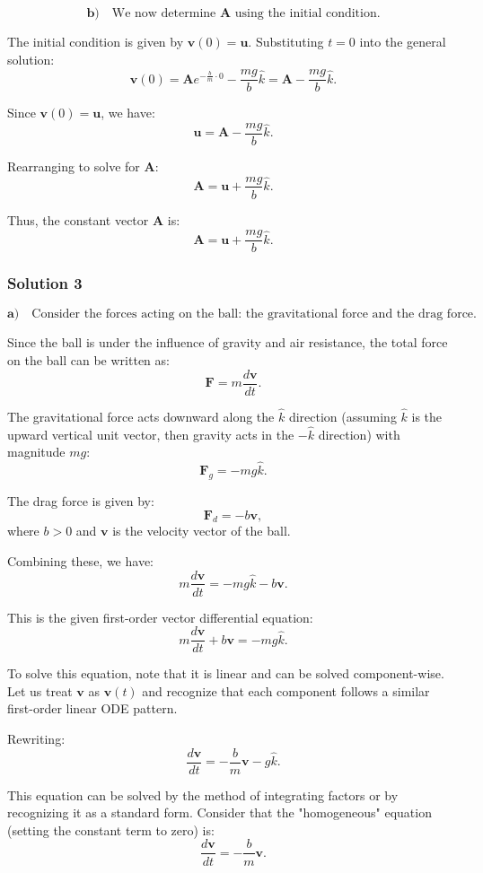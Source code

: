 \documentclass{article}
\begin{document}
\[
\textbf{b)}\quad \text{We now determine } \mathbf{A} \text{ using the initial condition.}
\]

The initial condition is given by \(\mathbf{v}(0) = \mathbf{u}\). Substituting \(t = 0\) into the general solution:
\[
\mathbf{v}(0) = \mathbf{A}e^{-\frac{b}{m}\cdot 0} - \frac{mg}{b}\hat{k} = \mathbf{A} - \frac{mg}{b}\hat{k}.
\]

Since \(\mathbf{v}(0) = \mathbf{u}\), we have:
\[
\mathbf{u} = \mathbf{A} - \frac{mg}{b}\hat{k}.
\]

Rearranging to solve for \(\mathbf{A}\):
\[
\mathbf{A} = \mathbf{u} + \frac{mg}{b}\hat{k}.
\]

Thus, the constant vector \(\mathbf{A}\) is:
\[
\boxed{\mathbf{A} = \mathbf{u} + \frac{mg}{b}\hat{k}.}
\]

\subsubsection{Solution 3}
\[
\textbf{a)} \quad \text{Consider the forces acting on the ball: the gravitational force and the drag force.}
\]

Since the ball is under the influence of gravity and air resistance, the total force on the ball can be written as:
\[
\mathbf{F} = m\frac{d\mathbf{v}}{dt}.
\]

The gravitational force acts downward along the \(\hat{k}\) direction (assuming \(\hat{k}\) is the upward vertical unit vector, then gravity acts in the \(-\hat{k}\) direction) with magnitude \(mg\):
\[
\mathbf{F}_g = - mg \hat{k}.
\]

The drag force is given by:
\[
\mathbf{F}_d = -b \mathbf{v},
\]
where \(b > 0\) and \(\mathbf{v}\) is the velocity vector of the ball.

Combining these, we have:
\[
m \frac{d\mathbf{v}}{dt} = -mg\hat{k} - b\mathbf{v}.
\]

This is the given first-order vector differential equation:
\[
m \frac{d\mathbf{v}}{dt} + b\mathbf{v} = -mg \hat{k}.
\]

To solve this equation, note that it is linear and can be solved component-wise. Let us treat \(\mathbf{v}\) as \(\mathbf{v}(t)\) and recognize that each component follows a similar first-order linear ODE pattern.

Rewriting:
\[
\frac{d\mathbf{v}}{dt} = -\frac{b}{m}\mathbf{v} - g\hat{k}.
\]

This equation can be solved by the method of integrating factors or by recognizing it as a standard form. Consider that the "homogeneous" equation (setting the constant term to zero) is:
\[
\frac{d\mathbf{v}}{dt} = -\frac{b}{m}\mathbf{v}.
\]
\end{document}

